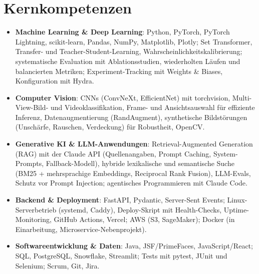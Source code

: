 \documentclass[11pt,a4paper,sans]{moderncv}
\begin{document}
\section{Kernkompetenzen}
\vspace{1pt}
\begin{itemize}

\item \textbf{Machine Learning \& Deep Learning}: Python, PyTorch, PyTorch Lightning, scikit-learn, Pandas, NumPy, Matplotlib, Plotly; Set Transformer, Transfer- und Teacher-Student-Learning, Wahrscheinlichkeitskalibrierung; systematische Evaluation mit Ablationsstudien, wiederholten Läufen und balancierten Metriken; Experiment-Tracking mit Weights \& Biases, Konfiguration mit Hydra.

\item \textbf{Computer Vision}: CNNs (ConvNeXt, EfficientNet) mit torchvision, Multi-View-Bild- und Videoklassifikation, Frame- und Ansichtsauswahl für effiziente Inferenz, Datenaugmentierung (RandAugment), synthetische Bildstörungen (Unschärfe, Rauschen, Verdeckung) für Robustheit, OpenCV.

\item \textbf{Generative KI \& LLM-Anwendungen}: Retrieval-Augmented Generation (RAG) mit der Claude API (Quellenangaben, Prompt Caching, System-Prompts, Fallback-Modell), hybride lexikalische und semantische Suche (BM25 + mehrsprachige Embeddings, Reciprocal Rank Fusion), LLM-Evals, Schutz vor Prompt Injection; agentisches Programmieren mit Claude Code.

\item \textbf{Backend \& Deployment}: FastAPI, Pydantic, Server-Sent Events; Linux-Serverbetrieb (systemd, Caddy), Deploy-Skript mit Health-Checks, Uptime-Monitoring, GitHub Actions, Vercel; AWS (S3, SageMaker); Docker (in Einarbeitung, Microservice-Nebenprojekt).

\item \textbf{Softwareentwicklung \& Daten}: Java, JSF/PrimeFaces, JavaScript/React; SQL, PostgreSQL, Snowflake, Streamlit; Tests mit pytest, JUnit und Selenium; Scrum, Git, Jira.

\end{itemize}

\end{document}
